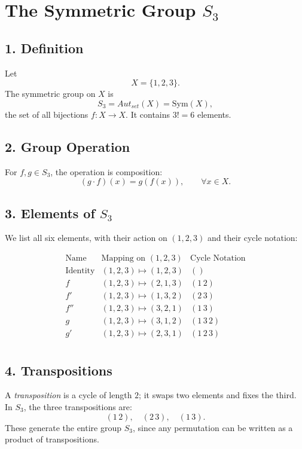 \documentclass[12pt]{article}
\begin{document}
	
	\section*{The Symmetric Group $S_3$}
	
	\subsection*{1. Definition}
	
	Let 
	\[
	X = \{1,2,3\}.
	\]
	The symmetric group on $X$ is
	\[
	S_3 = Aut_{set}(X) = \mathrm{Sym}(X),
	\]
	the set of all bijections $f: X \to X$.  
	It contains $3! = 6$ elements.
	
	\subsection*{2. Group Operation}
	
	For $f,g \in S_3$, the operation is composition:
	\[
	(g \cdot f)(x) = g(f(x)), \qquad \forall x \in X.
	\]
	
	\subsection*{3. Elements of $S_3$}
	
	We list all six elements, with their action on $(1,2,3)$ and their cycle notation:
	
	\[
	\begin{array}{c|c|c}
		\text{Name} & \text{Mapping on } (1,2,3) & \text{Cycle Notation} \\ \hline
		\text{Identity} & (1,2,3) \mapsto (1,2,3) & () \\ \hline
		f & (1,2,3) \mapsto (2,1,3) & (1\,2) \\ \hline
		f' & (1,2,3) \mapsto (1,3,2) & (2\,3) \\ \hline
		f'' & (1,2,3) \mapsto (3,2,1) & (1\,3) \\ \hline
		g & (1,2,3) \mapsto (3,1,2) & (1\,3\,2) \\ \hline
		g' & (1,2,3) \mapsto (2,3,1) & (1\,2\,3) \\
	\end{array}
	\]
	
	\subsection*{4. Transpositions}
	
	A \emph{transposition} is a cycle of length $2$; it swaps two elements and fixes the third.  
	In $S_3$, the three transpositions are:
	\[
	(1\,2), \quad (2\,3), \quad (1\,3).
	\]
	These generate the entire group $S_3$, since any permutation can be written as a product of transpositions.
	
\end{document}
